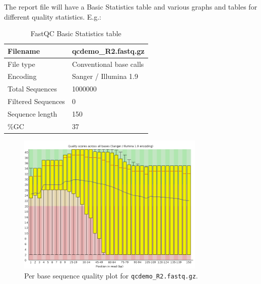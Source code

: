 \begin{note}
The report file will have a Basic Statistics table and various graphs and tables
for different quality statistics. E.g.:
\end{note}

\begin{table}[H]
  \centering
  \caption{FastQC Basic Statistics table}
    \begin{tabular}{ll}
    \toprule
    Filename & qcdemo\_R2.fastq.gz \\
    \midrule
    File type & Conventional base calls \\
    Encoding & Sanger / Illumina 1.9 \\
    Total Sequences & 1000000 \\
    Filtered Sequences & 0 \\
    Sequence length & 150 \\
    \%GC  & 37 \\
    \bottomrule
    \end{tabular}
  \label{tab:badexampleuntrimmed}
\end{table}

\begin{figure}[H]
\centering
\includegraphics[width=0.8\textwidth]{handout/bad.qcdemo_R2.png}
\caption{Per base sequence quality plot for \texttt{qcdemo\_R2.fastq.gz}.}
\label{fig:bad_example_untrimmed_plot}
\end{figure}

